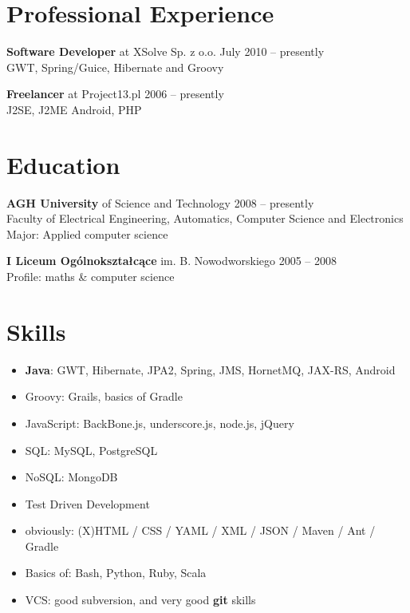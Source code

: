 \documentclass{res}
\begin{document}
\begin{resume} 

\section{Professional Experience}
{\bf Software Developer} at XSolve Sp. z o.o. \hfill July 2010 – presently\\
	GWT, Spring/Guice, Hibernate and Groovy

{\bf Freelancer} at Project13.pl \hfill 2006 – presently\\
	J2SE, J2ME Android, PHP 

\section{Education} 
{\bf AGH University} of Science and Technology \hfill 2008 – presently\\
	Faculty of Electrical Engineering, Automatics, Computer Science and Electronics\\
	Major: Applied computer science

{\bf I Liceum Ogólnokształcące} im. B. Nowodworskiego \hfill 2005 – 2008\\
	Profile: maths \& computer science

\section{Skills}
\begin{itemize}
 \item \textbf{Java}: GWT, Hibernate, JPA2, Spring, JMS, HornetMQ, JAX-RS, Android
 \item Groovy: Grails, basics of Gradle
 \item JavaScript: BackBone.js, underscore.js, node.js, jQuery
 \item SQL: MySQL, PostgreSQL
 \item NoSQL: MongoDB 
 \item Test Driven Development
 \item obviously: (X)HTML / CSS / YAML / XML / JSON / Maven / Ant / Gradle
 \item Basics of: Bash, Python, Ruby, Scala
 \item VCS: good subversion, and very good \textbf{git} skills
\end{itemize}


\end{resume}
\end{document}
